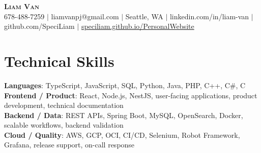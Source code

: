 \documentclass[letterpaper,11pt]{article}
\begin{document}

%
\begin{center}
    \textbf{\Huge \scshape Liam Van} \\ \vspace{1pt}
    \small 678-488-7259 $|$ \small {liamvanpj@gmail.com} $|$ Seattle, WA
 {{$|$ linkedin.com/in/liam-van} {$|$ github.com/SpeciLiam} {$|$ \href{https://speciliam.github.io/PersonalWebsite}{speciliam.github.io/PersonalWebsite}}}

\end{center}

\section{Technical Skills}
 \begin{itemize}[leftmargin=0.15in, label={}]
    \small{\item{
     \textbf{Languages}{: TypeScript, JavaScript, SQL, Python, Java, PHP, C++, C\#, C} \\
     \textbf{Frontend / Product}{: React, Node.js, NestJS, user-facing applications, product development, technical documentation} \\
     \textbf{Backend / Data}{: REST APIs, Spring Boot, MySQL, OpenSearch, Docker, scalable workflows, backend validation} \\
     \textbf{Cloud / Quality}{: AWS, GCP, OCI, CI/CD, Selenium, Robot Framework, Grafana, release support, on-call response} \\
    }}
 \end{itemize}
%
\end{document}
